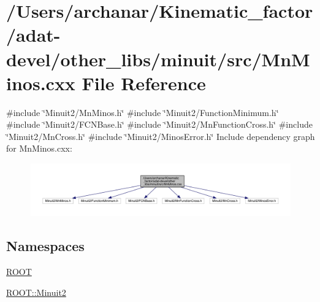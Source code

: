 \hypertarget{adat-devel_2other__libs_2minuit_2src_2MnMinos_8cxx}{}\section{/\+Users/archanar/\+Kinematic\+\_\+factor/adat-\/devel/other\+\_\+libs/minuit/src/\+Mn\+Minos.cxx File Reference}
\label{adat-devel_2other__libs_2minuit_2src_2MnMinos_8cxx}
{\ttfamily \#include \char`\"{}Minuit2/\+Mn\+Minos.\+h\char`\"{}}\newline
{\ttfamily \#include \char`\"{}Minuit2/\+Function\+Minimum.\+h\char`\"{}}\newline
{\ttfamily \#include \char`\"{}Minuit2/\+F\+C\+N\+Base.\+h\char`\"{}}\newline
{\ttfamily \#include \char`\"{}Minuit2/\+Mn\+Function\+Cross.\+h\char`\"{}}\newline
{\ttfamily \#include \char`\"{}Minuit2/\+Mn\+Cross.\+h\char`\"{}}\newline
{\ttfamily \#include \char`\"{}Minuit2/\+Minos\+Error.\+h\char`\"{}}\newline
Include dependency graph for Mn\+Minos.\+cxx\+:
\nopagebreak
\begin{figure}[H]
\begin{center}
\leavevmode
\includegraphics[width=350pt]{d0/d8f/adat-devel_2other__libs_2minuit_2src_2MnMinos_8cxx__incl}
\end{center}
\end{figure}
\subsection*{Namespaces}
\begin{DoxyCompactItemize}
\item 
 \mbox{\hyperlink{namespaceROOT}{R\+O\+OT}}
\item 
 \mbox{\hyperlink{namespaceROOT_1_1Minuit2}{R\+O\+O\+T\+::\+Minuit2}}
\end{DoxyCompactItemize}
